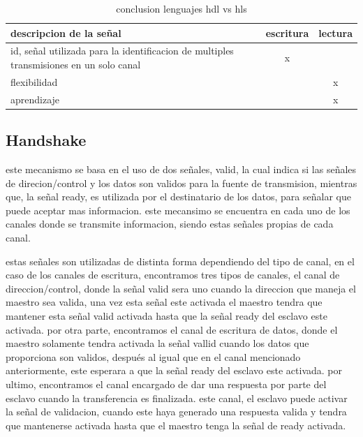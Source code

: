 \documentclass[11pt,spanish,listoffigures,listoftables]{tfgetsinf}
\begin{document}
         \begin{table}[h]
            \begin{center}
                  \begin{tabular}{|l|c|c|}
                  \hline
                  descripcion de la señal & escritura  &  lectura \\ \hline
                  id, señal utilizada para la identificacion de multiples transmisiones en un solo canal    &  x  &     \\ \hline
                  flexibilidad   &     &  x  \\ \hline
                  aprendizaje    &     &  x  \\
                  \hline
               \end{tabular}
               \caption{conclusion lenguajes hdl vs hls}
               \label{tab:signal_desc}
            \end{center}
         \end{table}

      \subsection{ Handshake }

         este mecanismo se basa en el uso de dos señales, valid, la cual indica
         si las señales de direcion/control y los datos son validos para la
         fuente de transmision, mientras que, la señal ready, es utilizada por
         el destinatario de los datos, para señalar que puede aceptar mas
         informacion. este mecansimo se encuentra en cada uno de los canales
         donde se transmite informacion, siendo estas señales propias de cada
         canal.

         estas señales son utilizadas de distinta forma dependiendo del tipo de
         canal, en el caso de los canales de escritura, encontramos tres tipos
         de canales, el canal de direccion/control, donde la señal valid sera
         uno cuando la direccion que maneja el maestro sea valida, una vez esta
         señal este activada el maestro tendra que mantener esta señal valid
         activada hasta que la señal ready del esclavo este activada. por otra
         parte, encontramos el canal de escritura de datos, donde el maestro
         solamente tendra activada la señal vallid cuando los datos que
         proporciona son validos, después al igual que en el canal mencionado
         anteriormente, este esperara a que la señal ready del esclavo este
         activada. por ultimo, encontramos el canal encargado de dar una
         respuesta por parte del esclavo cuando la transferencia es finalizada.
         este canal, el esclavo puede activar la señal de validacion, cuando
         este haya generado una respuesta valida y tendra que mantenerse
         activada hasta que el maestro tenga la señal de ready activada.
\end{document}
